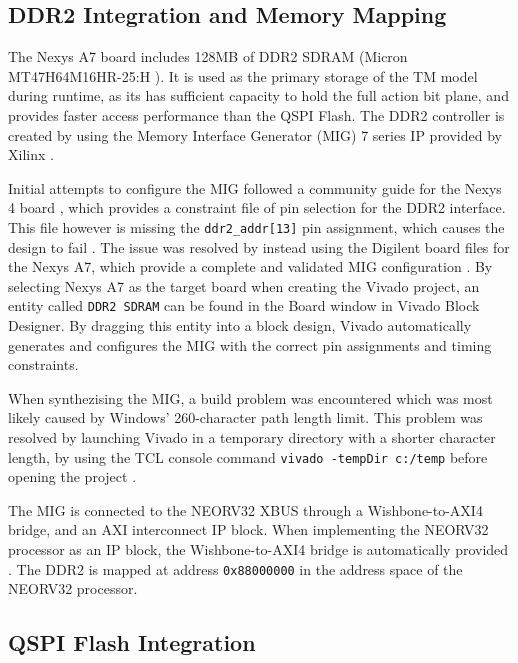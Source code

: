 \subsection{DDR2 Integration and Memory Mapping}
\label{sec:ddr2_integration}



The Nexys A7 board includes 128MB of DDR2 SDRAM (Micron MT47H64M16HR-25:H \cite{micron_mt47h64m16hr}). It is used as the primary storage of the TM model during runtime, as its has sufficient capacity to hold the full action bit plane, and provides faster access performance than the QSPI Flash. The DDR2 controller is created by using the Memory Interface Generator (MIG) 7 series IP provided by Xilinx \cite{amd_ug586_mis}.

Initial attempts to configure the MIG followed a community guide for the Nexys 4 board \cite{digilent_sram_to_ddr,chrispville_migexample}, which provides a constraint file of pin selection for the DDR2 interface. This file however is missing the \texttt{ddr2\_addr[13]} pin assignment, which causes the design to fail \cite{digilentforum_missingpin}. The issue was resolved by instead using the Digilent board files for the Nexys A7, which provide a complete and validated MIG configuration \cite{digilentforum_missingpin}. By selecting Nexys A7 as the target board when creating the Vivado project, an entity called \texttt{DDR2 SDRAM} can be found in the Board window in Vivado Block Designer. By dragging this entity into a block design, Vivado automatically generates and configures the MIG with the correct pin assignments and timing constraints.

When synthezising the MIG, a build problem was encountered which was most likely caused by Windows' 260-character path length limit. This problem was resolved by launching Vivado in a temporary directory with a shorter character length, by using the TCL console command \texttt{vivado -tempDir c:/temp} before opening the project \cite{amd_ar52787_longpath}.

The MIG is connected to the NEORV32 XBUS through a Wishbone-to-AXI4 bridge, and an AXI interconnect IP block. When implementing the NEORV32 processor as an IP block, the Wishbone-to-AXI4 bridge is automatically provided \cite{Nolting2024UserGuide}. The DDR2 is mapped at address \texttt{0x88000000} in the address space of the NEORV32 processor.


\subsection{QSPI Flash Integration}
\label{sec:qspi_integration}

